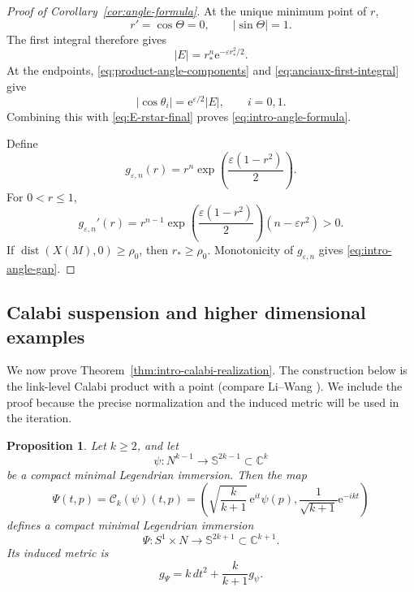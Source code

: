 \documentclass[11pt,a4paper]{article}
\numberwithin{equation}{section}
\newtheorem{proposition}[theorem]{Proposition}
\newcommand{\C}{\mathbb C}
\newcommand{\Sph}{\mathbb S}
\newcommand{\ee}{\mathrm e}
\newcommand{\dist}{\operatorname{dist}}
\begin{document}
\begin{proof}[Proof of Corollary~\ref{cor:angle-formula}]
At the unique minimum point of $r$,
$$
        r'=\cos\Theta=0,
        \qquad
        |\sin\Theta|=1.
$$
The first integral therefore gives
\begin{equation}\label{eq:E-rstar-final}
        |E|=r_*^n\ee^{-\varepsilon r_*^2/2}.
\end{equation}
At the endpoints, \eqref{eq:product-angle-components} and \eqref{eq:anciaux-first-integral} give
$$
        |\cos\theta_i|=\ee^{\varepsilon/2}|E|,
        \qquad i=0,1.
$$
Combining this with \eqref{eq:E-rstar-final} proves \eqref{eq:intro-angle-formula}.

Define
$$
        g_{\varepsilon,n}(r)=r^n\exp\!\left(\frac{\varepsilon(1-r^2)}{2}\right).
$$
For $0<r\le1$,
$$
        g_{\varepsilon,n}'(r)
        =r^{n-1}\exp\!\left(\frac{\varepsilon(1-r^2)}{2}\right)(n-\varepsilon r^2)>0.
$$
If $\dist(X(M),0)\ge\rho_0$, then $r_*\ge\rho_0$.  Monotonicity of $g_{\varepsilon,n}$ gives \eqref{eq:intro-angle-gap}.
\end{proof}
\subsection{Calabi suspension and higher dimensional examples}
We now prove Theorem~\ref{thm:intro-calabi-realization}.  The construction
below is the link-level Calabi product with a point (compare Li--Wang
\cite{LiWang2011Calabi}).  We include the proof because the precise
normalization and the induced metric will be used in the iteration.

\begin{proposition}\label{prop:calabi-suspension}
Let $k\ge2$, and let
$$
        \psi:N^{k-1}\longrightarrow\Sph^{2k-1}\subset\C^k
$$
be a compact minimal Legendrian immersion.  Then the map
\begin{equation}
        \Psi(t,p)
        =\mathcal C_k(\psi)(t,p)
        =
        \left(
        \sqrt{\frac{k}{k+1}}\,\ee^{it}\psi(p),
        \frac1{\sqrt{k+1}}\ee^{-ikt}
        \right)
\end{equation}
defines a compact minimal Legendrian immersion
$$
        \Psi:S^1\times N\longrightarrow\Sph^{2k+1}\subset\C^{k+1}.
$$
Its induced metric is
\begin{equation}\label{eq:calabi-metric}
        g_\Psi=k\,dt^2+\frac{k}{k+1}g_\psi.
\end{equation}
\end{proposition}
\end{document}
